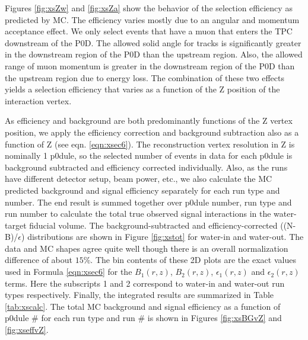 Figures \ref{fig:xsZw} and \ref{fig:xsZa} show the behavior of the selection efficiency as predicted by MC. The efficiency varies mostly due to an angular and momentum acceptance effect. We only select events that have a muon that enters the TPC downstream of the P0D. The allowed solid angle for tracks is significantly greater in the downstream region of the P0D than the upstream region. Also, the allowed range of muon momentum is greater in the downstream region of the P0D than the upstream region due to energy loss. The combination of these two effects yields a selection efficiency that varies as a function of the Z position of the interaction vertex.

As efficiency and background are both predominantly functions of the Z vertex position, we apply the efficiency correction and background subtraction also as a function of Z (see eqn. \ref{eqn:xsec6}). The reconstruction vertex resolution in Z is nominally 1 p0dule, so the selected number of events in data for each p0dule is background subtracted and efficiency corrected individually. Also, as the runs have different detector setup, beam power, etc., we also calculate the MC predicted background and signal efficiency separately for each run type and number. The end result is summed together over p0dule number, run type and run number to calculate the total true observed signal interactions in the water-target fiducial volume. The background-subtracted and efficiency-corrected ((N-B)/$\epsilon$) distributions are shown in Figure \ref{fig:xstot} for water-in and water-out. The data and MC shapes agree quite well though there is an overall normalization difference of about $15\%$. The bin contents of these 2D plots are the exact values used in Formula \ref{eqn:xsec6} for the $B_1(r,z)$, $B_2(r,z)$, $\epsilon_1(r,z)$ and $\epsilon_2(r,z)$ terms. Here the subscripts 1 and 2 correspond to water-in and water-out run types respectively. Finally, the integrated results are summarized in Table \ref{tab:xscalc}. The total MC background and signal efficiency as a function of p0dule \# for each run type and run \# is shown in Figures \ref{fig:xsBGvZ} and \ref{fig:xseffvZ}.

